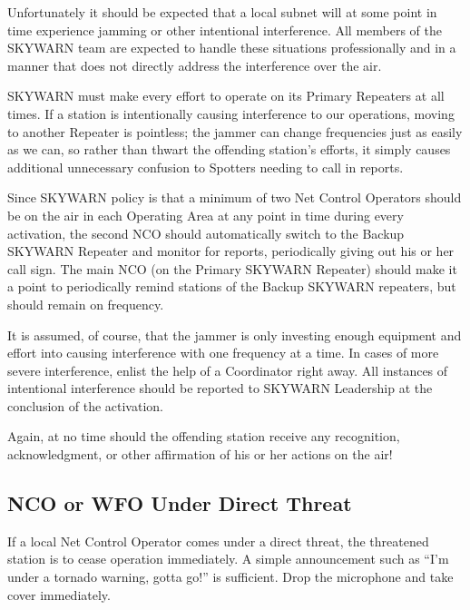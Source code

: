 \documentclass[pdflatex,letterpaper,twoside,12pt]{book}
\begin{document}
Unfortunately it should be expected that a local subnet will at some point in time experience jamming or other intentional interference.  All members of the SKYWARN team are expected to handle these situations professionally and in a manner that does not directly address the interference over the air. 

SKYWARN must make every effort to operate on its Primary Repeaters at all times.  If a station is intentionally causing interference to our operations, moving to another Repeater is pointless; the jammer can change frequencies just as easily as we can, so rather than thwart the offending station's efforts, it simply causes additional unnecessary confusion to Spotters needing to call in reports. 

Since SKYWARN policy is that a minimum of two Net Control Operators should be on the air in each Operating Area at any point in time during every activation, the second NCO should automatically switch to the Backup SKYWARN Repeater and monitor for reports, periodically giving out his or her call sign.  The main NCO (on the Primary SKYWARN Repeater) should make it a point to periodically remind stations of the Backup SKYWARN repeaters, but should remain on frequency. 

It is assumed, of course, that the jammer is only investing enough equipment and effort into causing interference with one frequency at a time.  In cases of more severe interference, enlist the help of a Coordinator right away.  All instances of intentional interference should be reported to SKYWARN Leadership at the conclusion of the activation. 

Again, at no time should the offending station receive any recognition, acknowledgment, or other affirmation of his or her actions on the air!

\subsection{NCO or WFO Under Direct Threat}

If a local Net Control Operator comes under a direct threat, the threatened station is to cease operation immediately.  A simple announcement such as ``I'm under a tornado warning, gotta go!'' is sufficient. Drop the microphone and take cover immediately.

\bigskip
\end{document}
